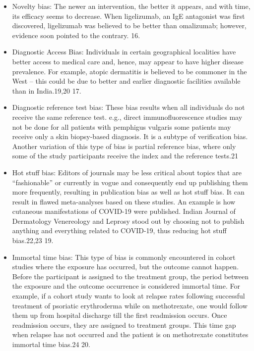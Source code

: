 \documentclass[12pt, a4paper, oneside]{book}   	%
\begin{document}
\begin{itemize}
				\item  Novelty bias: The newer an intervention, the better it appears, and with time, its efficacy seems to decrease. When ligelizumab, an IgE antagonist was first discovered, ligelizumab was believed to be better than omalizumab; however, evidence soon pointed to the contrary. 16.\autocite{Chakraborty_2023}
				\item  Diagnostic Access Bias: Individuals in certain geographical localities have better access to medical care and, hence, may appear to have higher disease prevalence. For example, atopic dermatitis is believed to be commoner in the West – this could be due to better and earlier diagnostic facilities available than in India.19,20 17.\autocite{Chakraborty_2023}
				\item  Diagnostic reference test bias: These bias results when all individuals do not receive the same reference test. e.g., direct immunofluorescence studies may not be done for all patients with pemphigus vulgaris some patients may receive only a skin biopsy-based diagnosis. It is a subtype of verification bias. Another variation of this type of bias is partial reference bias, where only some of the study participants receive the index and the reference tests.21\autocite{Chakraborty_2023}
				\item 
				Hot stuff bias: Editors of journals may be less critical about topics that are “fashionable” or currently in vogue and consequently end up publishing them more frequently, resulting in publication bias as well as hot stuff bias. It can result in flawed meta-analyses based on these studies. An example is how cutaneous manifestations of COVID-19 were published. Indian Journal of Dermatology Venereology and Leprosy stood out by choosing not to publish anything and everything related to COVID-19, thus reducing hot stuff bias.22,23 19. \autocite{Chakraborty_2023}
				\item Immortal time bias: This type of bias is commonly encountered in cohort studies where the exposure has occurred, but the outcome cannot happen. Before the participant is assigned to the treatment group, the period between the exposure and the outcome occurrence is considered immortal time. For example, if a cohort study wants to look at relapse rates following successful treatment of psoriatic erythroderma while on methotrexate, one would follow them up from hospital discharge till the first readmission occurs. Once readmission occurs, they are assigned to treatment groups. This time gap when relapse has not occurred and the patient is on methotrexate constitutes immortal time bias.24 20.\autocite{Chakraborty_2023}

\end{itemize}
\end{document}

